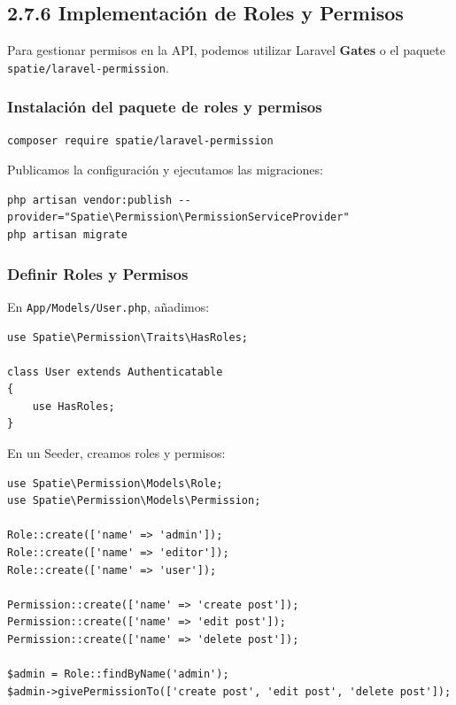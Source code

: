 \documentclass[11pt]{article}
\begin{document}
\subsection{2.7.6 Implementación de Roles y Permisos}
\label{sec:orgf245c2f}

Para gestionar permisos en la API, podemos utilizar Laravel \textbf{\textbf{Gates}}
o el paquete \texttt{spatie/laravel-permission}.

\subsubsection{Instalación del paquete de roles y permisos}
\label{sec:org1843da7}

\begin{verbatim}
composer require spatie/laravel-permission
\end{verbatim}

Publicamos la configuración y ejecutamos las migraciones:

\begin{verbatim}
php artisan vendor:publish --provider="Spatie\Permission\PermissionServiceProvider"
php artisan migrate
\end{verbatim}

\subsubsection{Definir Roles y Permisos}
\label{sec:org43f4456}

En \texttt{App/Models/User.php}, añadimos:

\begin{verbatim}
use Spatie\Permission\Traits\HasRoles;

class User extends Authenticatable
{
    use HasRoles;
}
\end{verbatim}

En un Seeder, creamos roles y permisos:

\begin{verbatim}
use Spatie\Permission\Models\Role;
use Spatie\Permission\Models\Permission;

Role::create(['name' => 'admin']);
Role::create(['name' => 'editor']);
Role::create(['name' => 'user']);

Permission::create(['name' => 'create post']);
Permission::create(['name' => 'edit post']);
Permission::create(['name' => 'delete post']);

$admin = Role::findByName('admin');
$admin->givePermissionTo(['create post', 'edit post', 'delete post']);
\end{verbatim}
\end{document}
